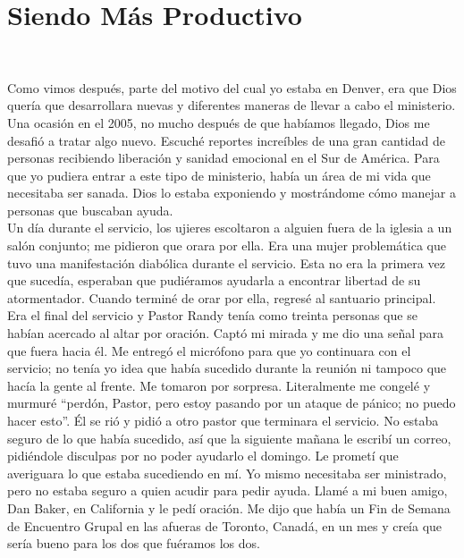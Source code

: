 \documentclass[twoside, 12pt]{book}
\begin{document}
 



\chapter{Siendo Más Productivo}
\

Como vimos después, parte del motivo del cual yo estaba en Denver, era que Dios quería que desarrollara nuevas y diferentes maneras de llevar a cabo el ministerio. Una ocasión en el 2005, no mucho después de que habíamos llegado, Dios me desafió a tratar algo nuevo. Escuché reportes increíbles de una gran cantidad de personas recibiendo liberación y sanidad emocional en el Sur de América. Para que yo pudiera entrar a este tipo de ministerio, había un área de mi vida que necesitaba ser sanada. Dios lo estaba exponiendo y mostrándome cómo manejar a personas que buscaban ayuda.\\
 
Un día durante el servicio, los ujieres escoltaron a alguien fuera de la iglesia a un salón conjunto; me pidieron que orara por ella. Era una mujer problemática que tuvo una manifestación diabólica durante el servicio. Esta no era la primera vez que sucedía, esperaban que pudiéramos ayudarla a encontrar libertad de su atormentador. Cuando terminé de orar por ella, regresé al santuario principal. Era el final del servicio y Pastor Randy tenía como treinta personas que se habían acercado al altar por oración. Captó mi mirada y me dio una señal para que fuera hacia él. Me entregó el micrófono para que yo continuara con el servicio; no tenía yo idea que había sucedido durante la reunión ni tampoco que hacía la gente al frente. Me tomaron por sorpresa. Literalmente me congelé y murmuré “perdón, Pastor, pero estoy pasando por un ataque de pánico; no puedo hacer esto”. Él se rió y pidió a otro pastor que terminara el servicio. No estaba seguro de lo que había sucedido, así que la siguiente mañana le escribí un correo, pidiéndole disculpas por no poder ayudarlo el domingo. Le prometí que averiguara lo que estaba sucediendo en mí. Yo mismo necesitaba ser ministrado, pero no estaba seguro a quien acudir para pedir ayuda. Llamé a mi buen amigo, Dan Baker, en California y le pedí oración. Me dijo que había un Fin de Semana de Encuentro Grupal en las afueras de Toronto, Canadá, en un mes y creía que sería bueno para los dos que fuéramos los dos.\\
\end{document}
